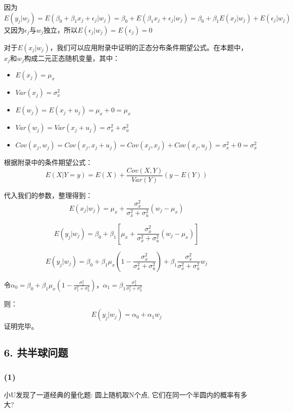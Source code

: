 \documentclass[UTF8]{ctexart}
\begin{document}
因为$E(y_{j}|w_{j})=E(\beta_{0}+\beta_{1}x_{j}+\epsilon_{j}|w_{j})=\beta_{0}+E(\beta_{1}x_{j}+\epsilon_{j}|w_{j})=\beta_{0}+\beta_{1}E(x_{j}|w_{j})+E(\epsilon_{j}|w_{j})$
又因为$\epsilon_{j}$与$w_{j}$独立，所以$E(\epsilon_{j}|w_{j})=E(\epsilon_{j})=0$

对于$E(x_{j}|w_{j})$，我们可以应用附录中证明的正态分布条件期望公式。在本题中，$x_j$和$w_j$构成二元正态随机变量，其中：
\begin{itemize}
    \item $E(x_j) = \mu_x$
    \item $Var(x_j) = \sigma_x^2$
    \item $E(w_j) = E(x_j + u_j) = \mu_x + 0 = \mu_x$
    \item $Var(w_j) = Var(x_j + u_j) = \sigma_x^2 + \sigma_u^2$
    \item $Cov(x_j, w_j) = Cov(x_j, x_j + u_j) = Cov(x_j, x_j) + Cov(x_j, u_j) = \sigma_x^2 + 0 = \sigma_x^2$
\end{itemize}

根据附录中的条件期望公式：
$$E(X|Y=y) = E(X) + \frac{Cov(X,Y)}{Var(Y)}(y - E(Y))$$

代入我们的参数，整理得到：
$$
E(x_{j}|w_{j}) = \mu_{x} + \frac{\sigma_{x}^{2}}{\sigma_{x}^{2} + \sigma_{u}^{2}}(w_{j} - \mu_{x})
$$

$$E(y_{j}|w_{j}) = \beta_{0} + \beta_{1}\left[\mu_{x} + \frac{\sigma_{x}^{2}}{\sigma_{x}^{2} + \sigma_{u}^{2}}(w_{j} - \mu_{x})\right]$$


$$E(y_{j}|w_{j}) = \beta_{0} + \beta_{1}\mu_{x}\left(1-\frac{\sigma_{x}^{2}}{\sigma_{x}^{2} + \sigma_{u}^{2}}\right) + \beta_{1}\frac{\sigma_{x}^{2}}{\sigma_{x}^{2} + \sigma_{u}^{2}}w_{j}$$

令$\alpha_{0} = \beta_{0} + \beta_{1}\mu_{x}\left(1-\frac{\sigma_{x}^{2}}{\sigma_{x}^{2} + \sigma_{u}^{2}}\right)$，$\alpha_{1} = \beta_{1}\frac{\sigma_{x}^{2}}{\sigma_{x}^{2} + \sigma_{u}^{2}}$

则：
$$E(y_{j}|w_{j}) = \alpha_{0} + \alpha_{1}w_{j}$$
证明完毕。
\subsection*{6. 共半球问题}
\subsubsection*{(1)}
小U发现了一道经典的量化题: 圆上随机取N个点, 它们在同一个半圆内的概率有多大?
\end{document}

